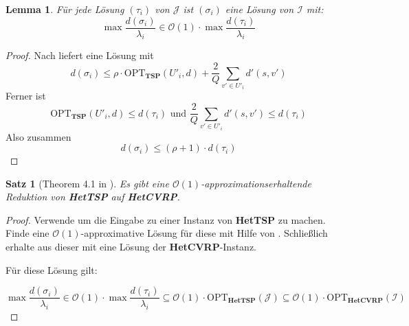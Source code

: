 \documentclass[a4paper,ngerman,12pt,bibtotoc]{scrartcl}
\theoremstyle{definition}
\theoremstyle{plain}
\newtheorem{lemma}[defn]{Lemma}
\newtheorem{satz}[defn]{Satz}
\theoremstyle{remark}
\newcommand{\Ic}{\mathcal{I}}
\newcommand{\Jc}{\mathcal{J}}
\newcommand{\Oc}{\mathcal{O}}
\newcommand{\OPT}{\mathrm{OPT}}
\newcommand{\TSP}{\textbf{TSP}}
\newcommand{\HetTSP}{\textbf{HetTSP}}
\newcommand{\HetCVRP}{\textbf{HetCVRP}}
\begin{document}
	\begin{lemma}
		Für jede Lösung $(\tau_i)$ von $\Jc$ ist $(\sigma_i)$ eine Lösung von $\Ic$ mit:
		\[\max \frac{d(\sigma_i)}{\lambda_i} \in \Oc(1)\cdot \max \frac{d(\tau_i)}{\lambda_i}\]
	\end{lemma}
	
	\begin{proof}
		Nach  liefert  eine Lösung mit 
			\[d(\sigma_i) \leq \rho\cdot \OPT_\TSP(U'_i, d) + \frac{2}{Q}\sum_{v'\in U'_i}d'(s,v')\]
		Ferner ist
			\[\OPT_\TSP(U'_i, d) \leq d(\tau_i) \text{ und } \frac{2}{Q}\sum_{v'\in U'_i}d'(s,v') \leq d(\tau_i)\]
		Also zusammen
			\[d(\sigma_i) \leq (\rho + 1) \cdot d(\tau_i)\]		
	\end{proof}	
	
	\begin{satz}[Theorem 4.1 in \cite{HetCVRP}]
		Es gibt eine $\Oc(1)$-approximationserhaltende Reduktion von \HetTSP{} auf \HetCVRP.
	\end{satz}
	
	\begin{proof}
		Verwende  um die Eingabe zu einer Instanz von \HetTSP{} zu machen. Finde eine $\Oc(1)$-approximative Lösung für diese mit Hilfe von . Schließlich erhalte aus dieser mit  eine Lösung der \HetCVRP-Instanz.

		Für diese Lösung gilt:
		
		 \[\max \frac{d(\sigma_i)}{\lambda_i} \in \Oc(1)\cdot \max \frac{d(\tau_i)}{\lambda_i} \subseteq \Oc(1)\cdot\OPT_\HetTSP(\Jc) \subseteq \Oc(1)\cdot\OPT_\HetCVRP(\Ic)\]
	\end{proof}

	\newpage
	\nocite{*}
	\printbibliography		
			
\end{document}
